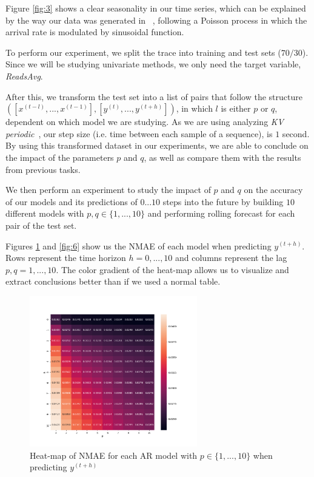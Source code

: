 \documentclass[10pt]{article}
\begin{document}
Figure \ref{fig:3} shows a clear seasonality in our time series, which can be explained by the way our data was generated in ~\cite{9012741}, following a Poisson process in which the arrival rate is modulated by sinusoidal function.

\pagebreak

To perform our experiment, we split the trace into training and test sets ($70/30$). Since we will be studying univariate methods, we only need the target variable, \textit{ReadsAvg}.

After this, we transform the test set into a list of pairs that follow the structure $([x^{(t-l)},...,x^{(t-1)}],[y^{(t)},...,y^{(t+h)}])$, in which $l$ is either $p$ or $q$, dependent on which model we are studying. As we are using analyzing \textit{KV periodic}~\cite{9012741}, our step size (i.e. time between each sample of a sequence), is $1$ second. By using this transformed dataset in our experiments, we are able to conclude on the impact of the parameters $p$ and $q$, as well as compare them with the results from previous tasks.

We then perform an experiment to study the impact of $p$ and $q$ on the accuracy of our models and its predictions of $0...10$ steps into the future by building $10$ different models with $p,q\in\{1,...,10\}$ and performing rolling forecast for each pair of the test set.

Figures \ref{fig:5} and \ref{fig:6} show us the \textsc{NMAE} of each model when predicting $y^{(t+h)}$. Rows represent the time horizon $h = 0,...,10$ and columns represent the lag $p,q = 1,...,10$. The color gradient of the heat-map allows us to visualize and extract conclusions better than if we used a normal table.

\begin{figure}[h!]
    \centering
    \includegraphics[width=0.65\textwidth,height=\textheight,keepaspectratio]{../ar_nmae_heatmap.png}
    \caption{Heat-map of \textsc{NMAE} for each AR model with $p\in\{1,...,10\}$ when predicting $y^{(t+h)}$}
    \label{fig:5}
\end{figure}
\end{document}
